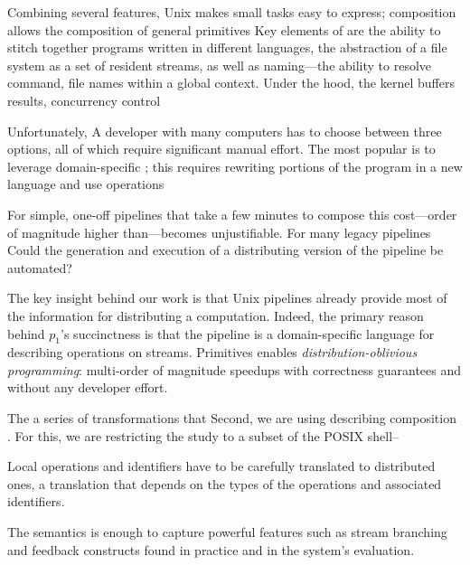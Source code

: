 \documentclass[sigplan,10pt,review,anonymous]{acmart}
\newcommand{\eg}{{\em e.g.}, }
\begin{document}
Combining several features, Unix makes small tasks easy to express;
  composition allows the composition of general primitives
Key elements of \unix are the ability to stitch together programs written in different languages, the abstraction of a file system as a set of resident streams, as well as naming---the ability to resolve command, file names within a global context.
Under the hood, the \unix kernel buffers results, concurrency control 


Unfortunately, 
A developer with many computers has to choose between three options, all of which require significant manual effort.
The most popular is to leverage domain-specific ; this requires rewriting portions of the program in a new language and use operations

For simple, one-off pipelines that take a few minutes to compose this cost---order of magnitude higher than---becomes unjustifiable.
For many legacy pipelines  
Could the generation and execution of a distributing version of the pipeline be automated?

The key insight behind our work is that Unix pipelines already provide most of the information for distributing a computation.
Indeed, the primary reason behind $p_1$'s succinctness is that the pipeline is a domain-specific language for describing operations on streams.
Primitives 
\sys enables \emph{distribution-oblivious programming}: 
  multi-order of magnitude speedups with correctness guarantees and without any developer effort.

The a series of transformations that 
Second, we are using describing composition . For this, we are restricting the study to a subset of the POSIX shell--

Local operations and identifiers have to be carefully translated to distributed ones, a translation that depends on the types of the operations and associated identifiers.

The semantics is enough to capture powerful features such as stream branching and feedback constructs found in practice and in the system's evaluation.
\end{document}
